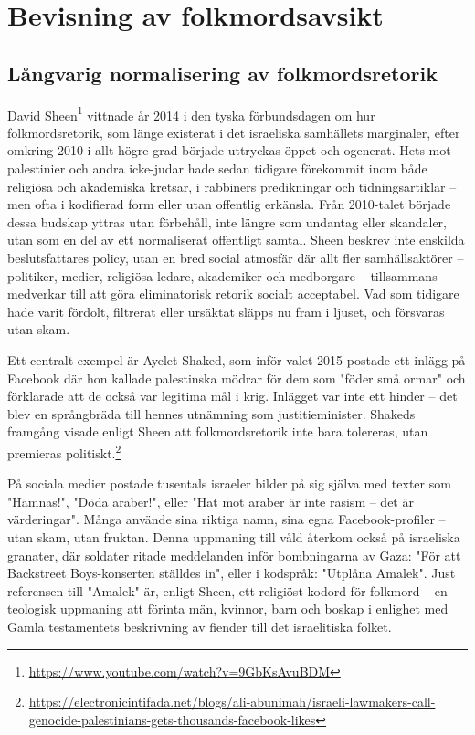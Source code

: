 


\section{Bevisning av folkmordsavsikt}
\subsection{Långvarig normalisering av folkmordsretorik}

David Sheen\footnote{\url{https://www.youtube.com/watch?v=9GbKsAvuBDM}} vittnade år 2014 i den tyska förbundsdagen om hur folkmordsretorik, som länge existerat
i det israeliska samhällets marginaler, efter omkring 2010 i allt högre grad började uttryckas öppet och
ogenerat. Hets mot palestinier och andra icke-judar hade sedan tidigare förekommit inom både religiösa
och akademiska kretsar, i rabbiners predikningar och tidningsartiklar – men ofta i kodifierad form eller
utan offentlig erkänsla. Från 2010-talet började dessa budskap yttras utan förbehåll, inte längre som
undantag eller skandaler, utan som en del av ett normaliserat offentligt samtal. Sheen beskrev inte enskilda
beslutsfattares policy, utan en bred social atmosfär där allt fler samhällsaktörer – politiker, medier,
religiösa ledare, akademiker och medborgare – tillsammans medverkar till att göra eliminatorisk retorik
socialt acceptabel. Vad som tidigare hade varit fördolt, filtrerat eller ursäktat släpps nu fram i ljuset, och
försvaras utan skam.


Ett centralt exempel är Ayelet Shaked, som inför valet 2015 postade ett inlägg på Facebook där hon kallade
palestinska mödrar för dem som "föder små ormar" och förklarade att de också var legitima mål i krig. Inlägget
var inte ett hinder – det blev en språngbräda till hennes utnämning som justitieminister. Shakeds
framgång visade enligt Sheen att folkmordsretorik inte bara tolereras, utan premieras politiskt.\footnote{\url{https://electronicintifada.net/blogs/ali-abunimah/israeli-lawmakers-call-genocide-palestinians-gets-thousands-facebook-likes}}

På sociala medier postade tusentals israeler bilder på sig själva med texter som "Hämnas!", "Döda araber!",
eller "Hat mot araber är inte rasism – det är värderingar". Många använde sina riktiga namn, sina egna
Facebook-profiler – utan skam, utan fruktan. Denna uppmaning till våld återkom också på israeliska granater,
där soldater ritade meddelanden inför bombningarna av Gaza: "För att Backstreet Boys-konserten ställdes in",
eller i kodspråk: "Utplåna Amalek". Just referensen till "Amalek" är, enligt Sheen, ett religiöst kodord för
folkmord – en teologisk uppmaning att förinta män, kvinnor, barn och boskap i enlighet med Gamla testamentets
beskrivning av fiender till det israelitiska folket.

